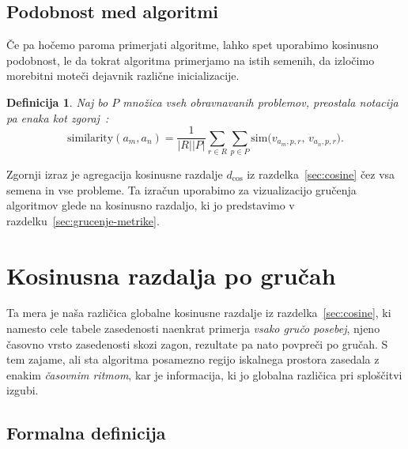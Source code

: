 \documentclass[a4paper, 12pt]{book}
\newtheorem{definicija}[izrek]{Definicija}
\begin{document}
\subsection{Podobnost med algoritmi}

Če pa hočemo paroma primerjati algoritme, lahko spet uporabimo kosinusno
podobnost, le da tokrat algoritma primerjamo na istih semenih, da izločimo
morebitni moteči dejavnik različne inicializacije.

\begin{definicija}
\label{def:similarity}
    Naj bo $P$ množica vseh obravnavanih problemov, preostala notacija pa enaka
kot zgoraj~\cite{clustopt2025}:
    \[
    \mathrm{similarity}(a_m, a_n) = \frac{1}{|R||P|}
    \sum_{r \in R} \sum_{p \in P}
    \mathrm{sim}\bigl(v_{a_m,p,r},\, v_{a_n,p,r}\bigr).
    \]
\end{definicija}

Zgornji izraz je agregacija kosinusne razdalje $d_{\cos}$ iz
razdelka~\ref{sec:cosine} čez vsa semena in vse probleme. Ta izračun
uporabimo za vizualizacijo gručenja algoritmov glede na kosinusno razdaljo,
ki jo predstavimo v razdelku~\ref{sec:grucenje-metrike}.

\clearpage

\section{Kosinusna razdalja po gručah}
\label{sec:cosine-columns}

Ta mera je naša različica globalne kosinusne razdalje iz
razdelka~\ref{sec:cosine}, ki namesto cele tabele zasedenosti naenkrat
primerja \emph{vsako gručo posebej}, njeno časovno vrsto zasedenosti skozi zagon, rezultate pa
nato povpreči po gručah. S tem zajame, ali sta algoritma posamezno regijo
iskalnega prostora zasedala z enakim \emph{časovnim ritmom}, kar je
informacija, ki jo globalna različica pri sploščitvi izgubi.

\subsection{Formalna definicija}
\end{document}
